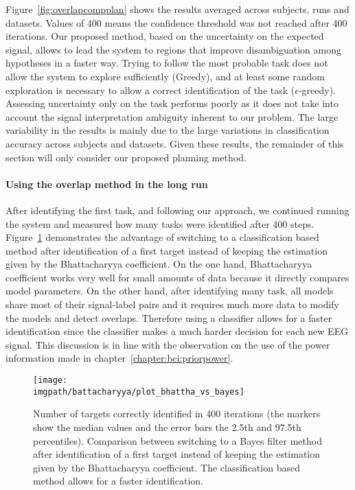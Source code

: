 Figure~\ref{fig:overlapcompplan} shows the results averaged across subjects, runs and datasets. Values of 400 means the confidence threshold was not reached after 400 iterations. Our proposed method, based on the uncertainty on the expected signal, allows to lead the system to regions that improve disambiguation among hypotheses in a faster way. Trying to follow the most probable task does not allow the system to explore sufficiently (Greedy), and at least some random exploration is necessary to allow a correct identification of the task ($\epsilon$-greedy). Assessing uncertainty only on the task performs poorly as it does not take into account the signal interpretation ambiguity inherent to our problem. The large variability in the results is mainly due to the large variations in classification accuracy across subjects and datasets. Given these results, the remainder of this section will only consider our proposed planning method.

\paragraph{Using the overlap method in the long run}

After identifying the first task, and following our approach, we continued running the system and measured how many tasks were identified after 400 steps. Figure~\ref{fig:overlapbhatta} demonstrates the advantage of switching to a classification based method after identification of a first target instead of keeping the estimation given by the Bhattacharyya coefficient. On the one hand, Bhattacharyya coefficient works very well for small amounts of data because it directly compares model parameters. On the other hand, after identifying many task, all models share most of their signal-label pairs and it requires much more data to modify the models and detect overlaps. Therefore using a classifier allows for a faster identification since the classifier makes a much harder decision for each new EEG signal. This discussion is in line with the observation on the use of the power information made in chapter~\ref{chapter:bci:priorpower}.

\begin{figure}[!ht]
    \centering
        \texttt{[image: \\imgpath/battacharyya/plot\_bhattha\_vs\_bayes]}
        \caption{Number of targets correctly identified in 400 iterations (the markers show the median values and the error bars the 2.5th and 97.5th percentiles). Comparison between switching to a Bayes filter method after identification of a first target instead of keeping the estimation given by the Bhattacharyya coefficient. The classification based method allows for a faster identification.}
        \label{fig:overlapbhatta}
\end{figure} 

